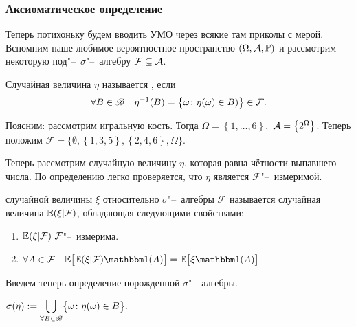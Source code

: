 \documentclass[../TV&MS.tex]{subfiles}
\begin{document}
\subsubsection{Аксиоматическое определение}

	Теперь потихоньку будем вводить УМО через всякие там приколы с мерой.
	Вспомним наше любимое вероятностное пространство $(\Omega, \mathcal{A}, \mathbb{P})$
	и рассмотрим некоторую под"--~$\sigma$"--~алгебру $\mathcal{F} \subseteq \mathcal{A}$.

\begin{Def}
    Случайная величина $\eta$ называется , если 
    $$\forall B \in \mathscr{B} \quad \eta^{-1}(B) = \bigl\{\omega\colon\eta(\omega) 
    \in B)\bigr\} \in \mathcal{F}.$$
\end{Def} 

\begin{Wtf}
    Поясним: рассмотрим игральную кость.
    Тогда $\Omega = \left\{ 1, \ldots, 6 \right\}$,\ $\mathcal{A} = \left\{ 2^{\Omega} \right\}$.
    Теперь положим $\mathcal{F} = \bigl\{ \emptyset, 
        \left\{ 1, 3, 5 \right\},
        \left\{ 2, 4, 6 \right\},
        \Omega \bigr\}$.
      
    Теперь рассмотрим случайную величину $\eta$, которая равна чётности выпавшего числа.
    По определению легко проверяется, что $\eta$ является $\mathcal{F}$"--~измеримой.
\end{Wtf} 

\begin{Def}
     случайной величины $\xi$ 
    относительно $\sigma$"--~алгебры $\mathcal{F}$ называется случайная
    величина $\mathbb{E}(\xi | \mathcal{F})$, обладающая следующими свойствами:
    \begin{enumerate}
        \item $\Expec(\xi | \mathcal{F})\ \mathcal{F}$"--~измерима.
        \item $\forall A \in \mathcal{F} \quad 
            \Expec\bigl[ \Expec(\xi | \mathcal{F}) \Ind(A) \bigr] =
            \Expec \bigl[ \xi \Ind(A) \bigr]$
    \end{enumerate} 
\end{Def}

	Введем теперь определение порожденной $\sigma$"--~алгебры.

\begin{Def}
    $\displaystyle \sigma(\eta) := 
    \bigcup\limits_{\forall B \in \mathscr{B}} \bigl\{\omega \colon \eta(\omega) \in B\bigr\}.$
\end{Def} 
\end{document}
